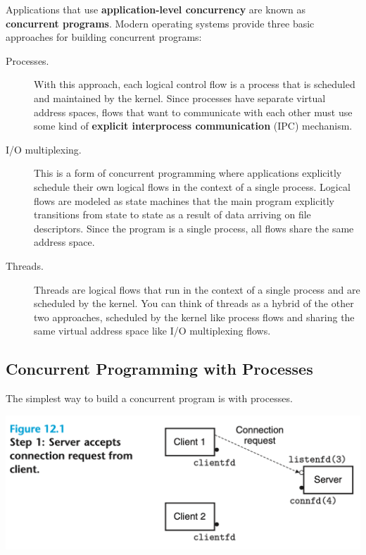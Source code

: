 \documentclass[11pt]{article}
\begin{document}
Applications that use \textbf{application-level concurrency} are known as \textbf{concurrent programs}. Modern operating systems provide three basic approaches for building concurrent programs:\\
\begin{description}
\item[{Processes.}] With this approach, each logical control flow is a process that is scheduled and maintained by the kernel. Since processes have separate virtual address spaces, flows that want to communicate with each other must use some kind of \textbf{explicit interprocess communication} (IPC) mechanism.\\
\item[{I/O multiplexing.}] This is a form of concurrent programming where applications explicitly schedule their own logical flows in the context of a single process. Logical flows are modeled as state machines that the main program explicitly transitions from state to state as a result of data arriving on file descriptors. Since the program is a single process, all flows share the same address space.\\
\item[{Threads.}] Threads are logical flows that run in the context of a single process and are scheduled by the kernel. You can think of threads as a hybrid of the other two approaches, scheduled by the kernel like process flows and sharing the same virtual address space like I/O multiplexing flows.\\
\end{description}



\subsection{Concurrent Programming with Processes}
\label{sec:org2e83175}
The simplest way to build a concurrent program is with processes.\\

\begin{center}
\includegraphics[width=.9\linewidth]{pics/figure12.1-process1.png}
\end{center}
\end{document}
